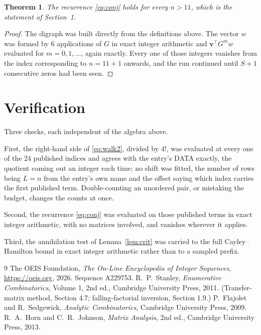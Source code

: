 \documentclass[11pt,a4paper]{article}
\theoremstyle{plain}
\newtheorem{theorem}{Theorem}
\theoremstyle{definition}
\begin{document}
\begin{theorem}
The recurrence \eqref{eq:conj} holds for every $n>11$, which is the statement of
Section~1.
\end{theorem}

\begin{proof}
The digraph was built directly from the definitions above. The vector $w$ was formed by
$6$ applications of $G$ in exact integer arithmetic and $\mathbf{v}^{\!\top}G^{m}w$
evaluated for $m=0,1,\dots$, again exactly. Every one of those integers vanishes from the
index corresponding to $n=11+1$ onwards, and the run continued until $S+1$ consecutive
zeros had been seen.
\end{proof}

\section{Verification}

Three checks, each independent of the algebra above.

First, the right-hand side of \eqref{eq:walk2}, divided by $4!$, was evaluated at every
one of the $24$ published indices and agrees with the entry's DATA exactly, the quotient
coming out an integer each time; no shift was fitted, the number of rows being $L=n$
from the entry's own name and the offset saying which index carries the first published term.
Double-counting an unordered pair, or mistaking the budget, changes the counts at once.

Second, the recurrence \eqref{eq:conj} was evaluated on those published terms in exact
integer arithmetic, with no matrices involved, and vanishes wherever it applies.

Third, the annihilation test of Lemma~\ref{lem:crit} was carried to the full
Cayley--Hamilton bound in exact integer arithmetic rather than to a sampled prefix.

\begin{thebibliography}{9}
 The OEIS Foundation, \emph{The On-Line Encyclopedia of Integer
Sequences}, \url{https://oeis.org}, 2026. Sequence A229753.
 R.~P.~Stanley, \emph{Enumerative Combinatorics}, Volume 1, 2nd ed.,
Cambridge University Press, 2011. (Transfer-matrix method, Section 4.7; falling-factorial
inversion, Section 1.9.)
 P.~Flajolet and R.~Sedgewick, \emph{Analytic Combinatorics}, Cambridge
University Press, 2009.
 R.~A.~Horn and C.~R.~Johnson, \emph{Matrix Analysis}, 2nd ed., Cambridge
University Press, 2013.
\end{thebibliography}
\end{document}
